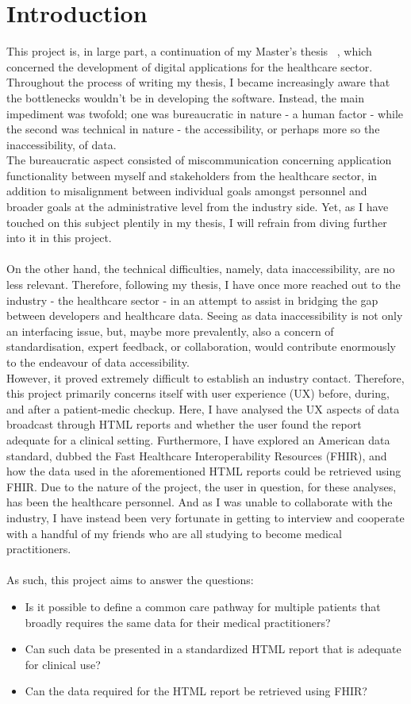 \section{Introduction}
This project is, in large part, a continuation of my Master's thesis ~\cite{thesis}, which concerned the development of digital applications for the healthcare sector. Throughout the process of writing my thesis, I became increasingly aware that the bottlenecks wouldn't be in developing the software. Instead, the main impediment was twofold; one was bureaucratic in nature - a human factor - while the second was technical in nature - the accessibility, or perhaps more so the inaccessibility, of data.
\\
The bureaucratic aspect consisted of miscommunication concerning application functionality between myself and stakeholders from the healthcare sector, in addition to misalignment between individual goals amongst personnel and broader goals at the administrative level from the industry side. Yet, as I have touched on this subject plentily in my thesis, I will refrain from diving further into it in this project. 
\\
\\
On the other hand, the technical difficulties, namely, data inaccessibility, are no less relevant. Therefore, following my thesis, I have once more reached out to the industry - the healthcare sector - in an attempt to assist in bridging the gap between developers and healthcare data. Seeing as data inaccessibility is not only an interfacing issue, but, maybe more prevalently, also a concern of standardisation, expert feedback, or collaboration, would contribute enormously to the endeavour of data accessibility.
\\
However, it proved extremely difficult to establish an industry contact. Therefore, this project primarily concerns itself with user experience (UX) before, during, and after a patient-medic checkup. Here, I have analysed the UX aspects of data broadcast through HTML reports and whether the user found the report adequate for a clinical setting. Furthermore, I have explored an American data standard, dubbed the Fast Healthcare Interoperability Resources (FHIR), and how the data used in the aforementioned HTML reports could be retrieved using FHIR.
Due to the nature of the project, the user in question, for these analyses, has been the healthcare personnel. And as I was unable to collaborate with the industry, I have instead been very fortunate in getting to interview and cooperate with a handful of my friends who are all studying to become medical practitioners. 
\\
\\
As such, this project aims to answer the questions:
\begin{itemize}
    \item Is it possible to define a common care pathway for multiple patients that broadly requires the same data for their medical practitioners?
    \item Can such data be presented in a standardized HTML report that is adequate for clinical use?
    \item Can the data required for the HTML report be retrieved using FHIR?
\end{itemize}   
